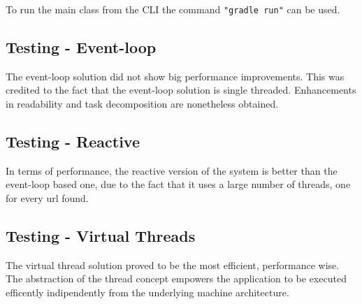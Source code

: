 \documentclass[12pt, a4paper]{report}
\begin{document}
To run the main class from the CLI the command \texttt{"gradle run"} can be used.

\subsection{Testing - Event-loop}
The event-loop solution did not show big performance improvements. This was credited to the fact that the event-loop solution is single threaded.
 Enhancements in readability and task decomposition are nonetheless obtained.

\subsection{Testing - Reactive}
In terms of performance, the reactive version of the system is better than the event-loop based one, due to the fact that it uses a large number of threads, one for every url found.

\subsection{Testing - Virtual Threads}
The virtual thread solution proved to be the most efficient, performance wise. The abstraction of the thread concept empowers the application to be executed
 efficently indipendently from the underlying machine architecture.


\end{document}
